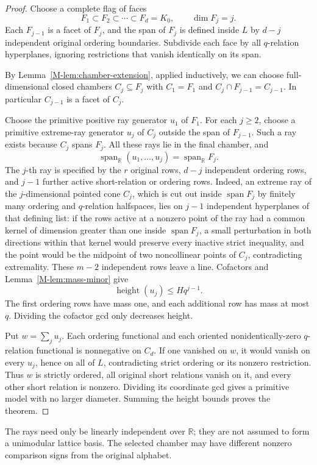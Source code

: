 \documentclass[11pt,reqno]{amsart}
\theoremstyle{plain}
\theoremstyle{definition}
\theoremstyle{plain}
\newcommand{\R}{\mathbb{R}}
\newcommand{\height}{\operatorname{height}}
\newcommand{\spn}{\operatorname{span}}
\theoremstyle{plain}
\theoremstyle{plain}
\theoremstyle{plain}
\theoremstyle{plain}
\theoremstyle{plain}
\theoremstyle{definition}
\theoremstyle{definition}
\theoremstyle{definition}
\theoremstyle{plain}
\begin{document}
\begin{proof}
Choose a complete flag of faces
\[
 F_1\subset F_2\subset\cdots\subset F_d=K_0,
 \qquad\dim F_j=j.
\]
Each $F_{j-1}$ is a facet of $F_j$, and the span of $F_j$ is defined
inside $L$ by $d-j$ independent original ordering boundaries. Subdivide each
face by all $q$-relation hyperplanes, ignoring restrictions that vanish
identically on its span.

By Lemma~\ref{M-lem:chamber-extension}, applied inductively, we can choose
full-dimensional closed chambers $C_j\subseteq F_j$ with $C_1=F_1$ and
$C_j\cap F_{j-1}=C_{j-1}$. In particular $C_{j-1}$ is a facet of $C_j$.

Choose the primitive positive ray generator $u_1$ of $F_1$. For each
$j\ge2$, choose a primitive extreme-ray generator $u_j$ of $C_j$ outside
the span of $F_{j-1}$. Such a ray exists because $C_j$ spans $F_j$.
All these rays lie in the final chamber, and
\[
 \spn_{\R}(u_1,\ldots,u_j)=\spn_{\R}F_j.
\]
The $j$-th ray is specified by the $r$ original rows, $d-j$ independent
ordering rows, and $j-1$ further active short-relation or ordering rows.
Indeed, an extreme ray of the $j$-dimensional pointed cone $C_j$, which is
cut out inside $\spn F_j$ by finitely many ordering and $q$-relation
halfspaces, lies on $j-1$ independent hyperplanes of that defining list: if
the rows active at a nonzero point of the ray had a common kernel of
dimension greater than one inside $\spn F_j$, a small perturbation in both
directions within that kernel would preserve every inactive strict
inequality, and the point would be the midpoint of two noncollinear points
of $C_j$, contradicting extremality.
These $m-2$ independent rows leave a line. Cofactors and
Lemma~\ref{M-lem:mass-minor} give
\[
 \height(u_j)\le Hq^{j-1}.
\]
The first ordering rows have mass one, and each additional row has mass
at most $q$. Dividing the cofactor gcd only decreases height.

Put $w=\sum_ju_j$. Each ordering functional and each oriented
nonidentically-zero $q$-relation functional is nonnegative on $C_d$. If
one vanished on $w$, it would vanish on every $u_j$, hence on all of $L$,
contradicting strict ordering or its nonzero restriction. Thus $w$ is
strictly ordered, all original short relations vanish on it, and every
other short relation is nonzero. Dividing its coordinate gcd gives a
primitive model with no larger diameter. Summing the height bounds
proves the theorem.
\end{proof}

The rays need only be linearly independent over $\R$; they are
not assumed to form a unimodular lattice basis. The selected chamber
may have different nonzero comparison signs from the original alphabet.
\end{document}
